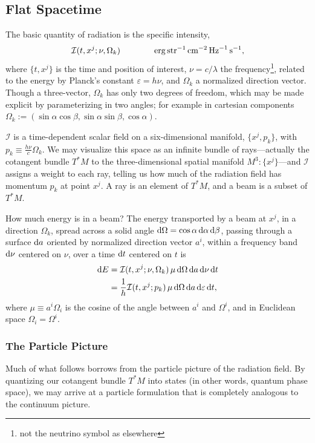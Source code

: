 \subsection{Flat Spacetime}
The basic quantity of radiation is the specific intensity,
\begin{equation}
  \mathcal{I}(t,x^j;\nu,\Omega_k) \qquad \qquad
  {\rm erg}\,{\rm str}^{-1}\,{\rm cm}^{-2}\,{\rm Hz}^{-1}\,{\rm s}^{-1}, \nonumber
\end{equation}
where $\{t,x^j\}$ is the time and position of interest,
$\nu=c/\lambda$ the frequency\footnote{not the neutrino symbol as elsewhere},
related to the energy by Planck's constant $\varepsilon=h\nu$, and
$\Omega_k$ a normalized direction vector. Though a three-vector, $\Omega_k$
has only two degrees of freedom, which may be made explicit by parameterizing
in two angles; for example in cartesian components
$\Omega_k:=(\sin\alpha\cos\beta,\sin\alpha\sin\beta,\cos\alpha)$.

$\mathcal{I}$ is a time-dependent scalar field on a six-dimensional manifold,
$\{x^j,p_k\}$, with $p_k\equiv\frac{h\nu}{c}\Omega_k$.
We may visualize this space as an infinite bundle of rays---actually the
cotangent bundle $T^*M$ to the three-dimensional
spatial manifold $M^3:\{x^j\}$---and $\mathcal{I}$
assigns a weight to each ray, telling us how much of the radiation field has
momentum $p_k$ at point $x^j$. A ray is an element of $T^*M$,
and a beam is a subset of $T^*M$.

How much energy is in a beam?
The energy transported by a beam at $x^j$,
in a direction $\Omega_k$,
spread across a solid angle $\mathrm{d}\Omega=\cos\alpha\,\mathrm{d}\alpha\,\mathrm{d}\beta$,
passing through a surface $\mathrm{d} a$
oriented by normalized direction vector $a^i$,
within a frequency band $\mathrm{d} \nu$ centered on $\nu$,
over a time $\mathrm{d} t$ centered on $t$ is
\begin{align}
  \label{eqn:beam_energy_I_nu}
  \mathrm{d} E &= \mathcal{I}(t,x^j;\nu,\Omega_k)\,
  \mu\, \mathrm{d}\Omega\, \mathrm{d} a\, \mathrm{d}\nu\, \mathrm{d} t \\
  \label{eqn:beam_energy_I_eps}
  &= \frac{1}{h} \mathcal{I}(t,x^j;p_k)\,
  \mu\, \mathrm{d}\Omega\, \mathrm{d} a\, \mathrm{d}\varepsilon\, \mathrm{d} t,
\end{align}
where $\mu\equiv a^i\Omega_i$ is the cosine of the angle between $a^i$ and
$\Omega^i$, and in Euclidean space $\Omega_i=\Omega^i$.

\subsubsection{The Particle Picture}
Much of what follows borrows from the particle picture of the radiation field.
By quantizing our cotangent bundle $T^*M$ into states (in other words,
quantum phase space), we may arrive at a particle formulation that is completely
analogous to the continuum picture.

